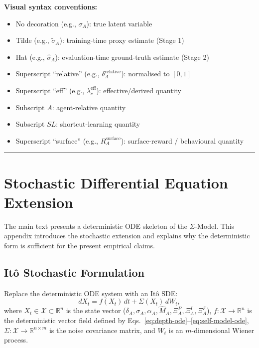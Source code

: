 \documentclass[10pt]{article}
\begin{document}
\textbf{Visual syntax conventions:}
\begin{itemize}[nosep]
\item No decoration (e.g., $\sigma_A$): true latent variable
\item Tilde (e.g., $\tilde{\sigma}_A$): training-time proxy estimate (Stage 1)
\item Hat (e.g., $\hat{\sigma}_A$): evaluation-time ground-truth estimate (Stage 2)
\item Superscript ``relative'' (e.g., $\delta_A^{\text{relative}}$): normalised to $[0,1]$
\item Superscript ``eff'' (e.g., $\lambda_c^{\text{eff}}$): effective/derived quantity
\item Subscript $A$: agent-relative quantity
\item Subscript $SL$: shortcut-learning quantity
\item Superscript ``surface'' (e.g., $R_A^{\text{surface}}$): surface-reward / behavioural quantity
\end{itemize}

\noindent\rule{\linewidth}{0.4pt}

\clearpage
\section{Stochastic Differential Equation Extension}\label{app:sde}

The main text presents a deterministic ODE skeleton of the $\Sigma$-Model.
This appendix introduces the stochastic extension and explains why the
deterministic form is sufficient for the present empirical claims.

\subsection{It\^o Stochastic Formulation}

Replace the deterministic ODE system with an It\^o SDE:
\begin{equation}\label{eq:sde-full}
dX_t = f(X_t)\,dt + \Sigma(X_t)\,dW_t,
\end{equation}
where $X_t \in \mathcal{X} \subset \mathbb{R}^n$ is the state vector
($\delta_A, \sigma_A, \alpha_A, \hat{M}_A, \Xi_A^P, \Xi_A^I, \Xi_A^F$),
$f: \mathcal{X} \to \mathbb{R}^n$ is the deterministic vector field
defined by Eqs.~\eqref{eq:depth-ode}--\eqref{eq:self-model-ode},
$\Sigma: \mathcal{X} \to \mathbb{R}^{n \times m}$ is the noise
covariance matrix, and $W_t$ is an $m$-dimensional Wiener process.
\end{document}
